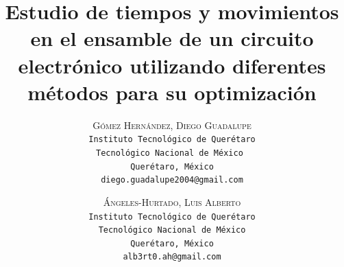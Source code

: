     \lfoot{ \thepage}
    
    \setlength{\droptitle}{-5\baselineskip} %
    \title{\textbf{Estudio de tiempos y movimientos en el ensamble de un circuito electrónico utilizando diferentes métodos para su optimización }} %
    
     \author{ 
     \textsc{Gómez Hernández, Diego Guadalupe}\\ 
     \texttt{ Instituto Tecnológico de Querétaro } \\ 
     \texttt{Tecnológico Nacional de México } \\ 
     \texttt{Querétaro, México}\\ 
     \texttt{diego.guadalupe2004@gmail.com} 
     \and 
     \textsc{Ángeles-Hurtado, Luis Alberto}\\ 
     \texttt{ Instituto Tecnológico de Querétaro } \\ 
     \texttt{ Tecnológico Nacional de México } \\ 
     \texttt{Querétaro, México}\\ 
     \texttt{alb3rt0.ah@gmail.com} 
    }
    
    
    
    
